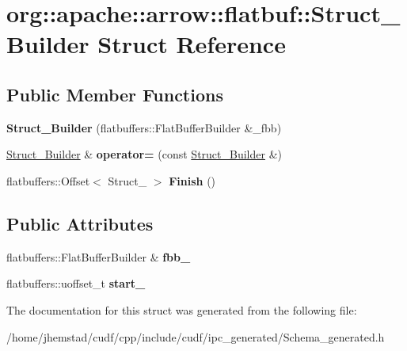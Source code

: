 \hypertarget{structorg_1_1apache_1_1arrow_1_1flatbuf_1_1Struct__Builder}{}\section{org\+:\+:apache\+:\+:arrow\+:\+:flatbuf\+:\+:Struct\+\_\+\+Builder Struct Reference}
\label{structorg_1_1apache_1_1arrow_1_1flatbuf_1_1Struct__Builder}
\subsection*{Public Member Functions}
\begin{DoxyCompactItemize}
\item 
{\bfseries Struct\+\_\+\+Builder} (flatbuffers\+::\+Flat\+Buffer\+Builder \&\+\_\+fbb)\hypertarget{structorg_1_1apache_1_1arrow_1_1flatbuf_1_1Struct__Builder_ac72bca77b6e83272a631455081f6e0c0}{}\label{structorg_1_1apache_1_1arrow_1_1flatbuf_1_1Struct__Builder_ac72bca77b6e83272a631455081f6e0c0}

\item 
\hyperlink{structorg_1_1apache_1_1arrow_1_1flatbuf_1_1Struct__Builder}{Struct\+\_\+\+Builder} \& {\bfseries operator=} (const \hyperlink{structorg_1_1apache_1_1arrow_1_1flatbuf_1_1Struct__Builder}{Struct\+\_\+\+Builder} \&)\hypertarget{structorg_1_1apache_1_1arrow_1_1flatbuf_1_1Struct__Builder_afb0aced139d2c9b88930ba1102affaf1}{}\label{structorg_1_1apache_1_1arrow_1_1flatbuf_1_1Struct__Builder_afb0aced139d2c9b88930ba1102affaf1}

\item 
flatbuffers\+::\+Offset$<$ Struct\+\_\+ $>$ {\bfseries Finish} ()\hypertarget{structorg_1_1apache_1_1arrow_1_1flatbuf_1_1Struct__Builder_a09517a47f11f9e52eb8f4f503078bf2e}{}\label{structorg_1_1apache_1_1arrow_1_1flatbuf_1_1Struct__Builder_a09517a47f11f9e52eb8f4f503078bf2e}

\end{DoxyCompactItemize}
\subsection*{Public Attributes}
\begin{DoxyCompactItemize}
\item 
flatbuffers\+::\+Flat\+Buffer\+Builder \& {\bfseries fbb\+\_\+}\hypertarget{structorg_1_1apache_1_1arrow_1_1flatbuf_1_1Struct__Builder_ab5fdf16445082b62139ae3b2d8fbca41}{}\label{structorg_1_1apache_1_1arrow_1_1flatbuf_1_1Struct__Builder_ab5fdf16445082b62139ae3b2d8fbca41}

\item 
flatbuffers\+::uoffset\+\_\+t {\bfseries start\+\_\+}\hypertarget{structorg_1_1apache_1_1arrow_1_1flatbuf_1_1Struct__Builder_ae2f9cadf4cb6d83d1eae199d6527d8c7}{}\label{structorg_1_1apache_1_1arrow_1_1flatbuf_1_1Struct__Builder_ae2f9cadf4cb6d83d1eae199d6527d8c7}

\end{DoxyCompactItemize}


The documentation for this struct was generated from the following file\+:\begin{DoxyCompactItemize}
\item 
/home/jhemstad/cudf/cpp/include/cudf/ipc\+\_\+generated/Schema\+\_\+generated.\+h\end{DoxyCompactItemize}
